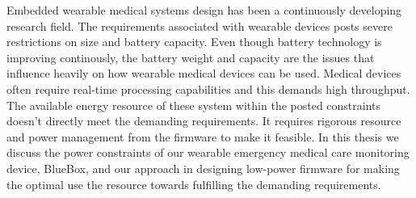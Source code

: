 \newcommand{\mypubentry}[3]{
  \begin{tabular*}{1\textwidth}{@{\extracolsep{\fill}}p{4.5in}r}
    \textbf{#1} & \textbf{#2} \\ 
    \multicolumn{2}{@{\extracolsep{\fill}}p{.95\textwidth}}{#3}\vspace{6pt} \\
  \end{tabular*}
}
\newcommand{\mysoftentry}[3]{
  \begin{tabular*}{1\textwidth}{@{\extracolsep{\fill}}lr}
    \textbf{#1} & \url{#2} \\
    \multicolumn{2}{@{\extracolsep{\fill}}p{.95\textwidth}}
    {\emph{#3}}\vspace{-6pt} \\
  \end{tabular*}
}

\thesisabstract
{
  Embedded wearable medical systems design has been a continuously developing research field. The requirements associated with wearable devices posts severe restrictions on size and battery capacity. Even though battery technology is improving continously, the battery weight and capacity are the issues that influence heavily on how wearable medical devices can be used. Medical devices often require real-time processing capabilities and this demands high throughput. The available energy resource of these system within the posted constraints doesn't directly meet the demanding requirements. It requires rigorous resource and power management from the firmware to make it feasible. In this thesis we discuss the power constraints of our wearable emergency medical care monitoring device, BlueBox, and our approach in designing low-power firmware for making the optimal use the resource towards fulfilling the demanding  requirements.
}


